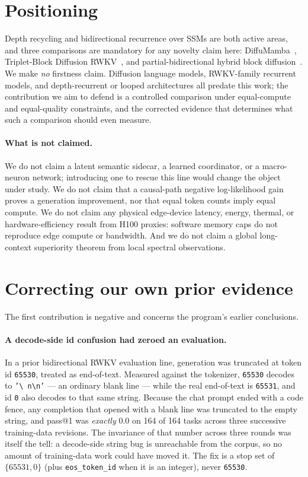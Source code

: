 \documentclass[11pt]{article}
\begin{document}
\section{Positioning}

Depth recycling and bidirectional recurrence over SSMs are both active areas, and three
comparisons are mandatory for any novelty claim here: DiffuMamba~\cite{diffumamba},
Triplet-Block Diffusion RWKV~\cite{tripletrwkv}, and partial-bidirectional hybrid block
diffusion~\cite{partialbidir}. We make \emph{no} firstness claim. Diffusion language
models, RWKV-family recurrent models, and depth-recurrent or looped architectures all
predate this work; the contribution we aim to defend is a controlled comparison under
equal-compute and equal-quality constraints, and the corrected evidence that determines
what such a comparison should even measure.

\paragraph{What is not claimed.} We do not claim a latent semantic sidecar, a learned
coordinator, or a macro-neuron network; introducing one to rescue this line would change
the object under study. We do not claim that a causal-path negative log-likelihood gain
proves a generation improvement, nor that equal token counts imply equal compute. We do
not claim any physical edge-device latency, energy, thermal, or hardware-efficiency
result from H100 proxies: software memory caps do not reproduce edge compute or
bandwidth. And we do not claim a global long-context superiority theorem from local
spectral observations.

\section{Correcting our own prior evidence}
\label{sec:correction}

The first contribution is negative and concerns the program's earlier conclusions.

\paragraph{A decode-side id confusion had zeroed an evaluation.} In a prior bidirectional
RWKV evaluation line, generation was truncated at token id \texttt{65530}, treated as
end-of-text. Measured against the tokenizer, \texttt{65530} decodes to \texttt{'\textbackslash
n\textbackslash n'} --- an ordinary blank line --- while the real end-of-text is
\texttt{65531}, and id \texttt{0} also decodes to that same string. Because the chat
prompt ended with a code fence, any completion that opened with a blank line was
truncated to the empty string, and pass@1 was \emph{exactly} $0.0$ on 164 of 164 tasks
across three successive training-data revisions. The invariance of that number across
three rounds was itself the tell: a decode-side string bug is unreachable from the
corpus, so no amount of training-data work could have moved it. The fix is a stop set of
$\{65531, 0\}$ (plus \texttt{eos\_token\_id} when it is an integer), never \texttt{65530}.
\end{document}
